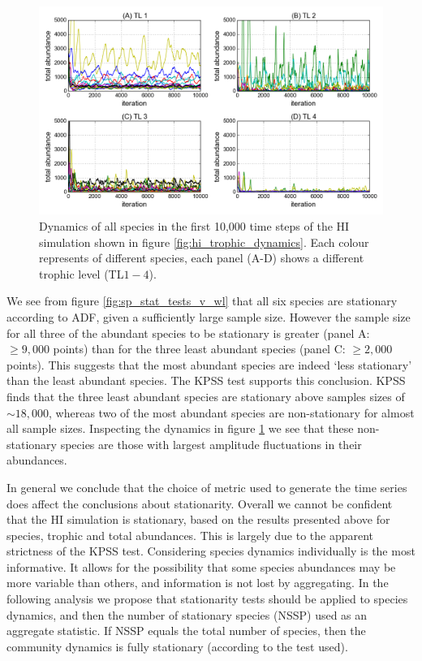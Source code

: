 \begin{figure}[ht!]
	\centering
	\includegraphics[width=1.0\linewidth]{"./chapters/chapter04b/figures/hi_sp_by_tl_part10000"}
    \caption{Dynamics of all species in the first 10,000 time steps of the HI simulation shown in figure \ref{fig:hi_trophic_dynamics}. Each colour represents of different species, each panel (A-D) shows a different trophic level (TL$1-4$).}    
    \label{fig:dynamics_by_species}
\end{figure}

We see from figure \ref{fig:sp_stat_tests_v_wl} that all six species are stationary according to ADF, given a sufficiently large sample size. However the sample size for all three of the abundant species to be stationary is greater (panel A: $\geq 9,000$ points) than for the three least abundant species (panel C: $\geq 2,000$ points). This suggests that the most abundant species are indeed `less stationary' than the least abundant species. The KPSS test supports this conclusion. KPSS finds that the three least abundant species are stationary above samples sizes of $\sim 18,000$, whereas two of the most abundant species are non-stationary for almost all sample sizes. Inspecting the dynamics in figure \ref{fig:dynamics_by_species} we see that these non-stationary species are those with largest amplitude fluctuations in their abundances. 

In general we conclude that the choice of metric used to generate the time series does affect the conclusions about stationarity. Overall we cannot be confident that the HI simulation is stationary, based on the results presented above for species, trophic and total abundances. This is largely due to the apparent strictness of the KPSS test. Considering species dynamics individually is the most informative. It allows for the possibility that some species abundances may be more variable than others, and information is not lost by aggregating.  In the following analysis we propose that stationarity tests should be applied to species dynamics, and then the number of stationary species (NSSP) used as an aggregate statistic. If NSSP equals the total number of species, then the community dynamics is fully stationary (according to the test used).   


